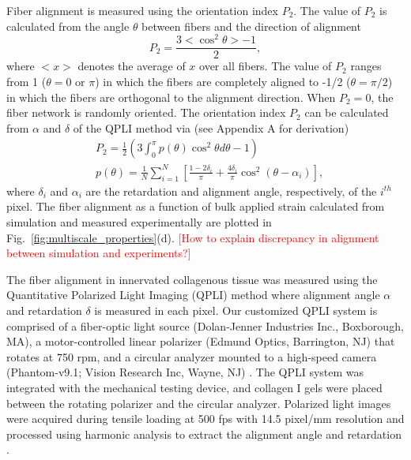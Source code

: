 \documentclass[]{interact}
\newcommand{\red}[1]{\textcolor{red}{[#1]}}
\begin{document}
Fiber alignment is measured using the orientation index $P_2$. The value of $P_2$ is calculated from the angle $\theta$ between fibers and the direction of alignment
%
\begin{equation}
P_2 = \frac{3 <\cos^2\theta> - 1}{2},
\label{eq:P2_simulation}
\end{equation}
%
where $<x>$ denotes the average of $x$ over all fibers. The value of $P_2$ ranges from 1 ($\theta=0$ or $\pi$) in which the fibers are completely aligned to -1/2 ($\theta=\pi/2$) in which the fibers are orthogonal to the alignment direction. When $P_2=0$, the fiber network is randomly oriented. The orientation index $P_2$ can be calculated from $\alpha$ and $\delta$ of the QPLI method via (see Appendix A for derivation)
%
\begin{align}
&P_2 = \frac{1}{2}\left(3 \int_0^{\pi} p(\theta) \cos^2\theta d\theta - 1\right) \nonumber\\
&p(\theta) = \frac{1}{N} \sum_{i=1}^N \left[ \frac{1-2\delta_i}{\pi} + \frac{4 \delta_i}{\pi}\cos^2(\theta - \alpha_i)\right],
\label{eq:P2_experiment}
\end{align}
%
where $\delta_i$ and $\alpha_i$ are the retardation and alignment angle, respectively, of the $i^{th}$ pixel. The fiber alignment as a function of bulk applied strain calculated from simulation and measured experimentally are plotted in Fig.\ \ref{fig:multiscale_properties}(d). \red{How to explain discrepancy in alignment between simulation and experiments?}  

The fiber alignment in innervated collagenous tissue was measured using the Quantitative Polarized Light Imaging (QPLI) method \citep{Quinn:2008df,Quinn:2009bf} where alignment angle $\alpha$ and retardation $\delta$ is measured in each pixel. Our customized QPLI system \citep{Zhang:2016ga} is comprised of a fiber-optic light source (Dolan-Jenner Industries Inc., Boxborough, MA), a motor-controlled linear polarizer (Edmund Optics, Barrington, NJ) that rotates at 750 rpm, and a circular analyzer mounted to a high-speed camera (Phantom-v9.1; Vision Research Inc, Wayne, NJ) \citep{Zhang:2016ga}. The QPLI system was integrated with the mechanical testing device, and collagen I gels were placed between the rotating polarizer and the circular analyzer. Polarized light images were acquired during tensile loading at 500 fps with 14.5 pixel/mm resolution and processed using harmonic analysis to extract the alignment angle and retardation \citep{Tower:2002hk,Quinn:2008df}.

\end{document}
